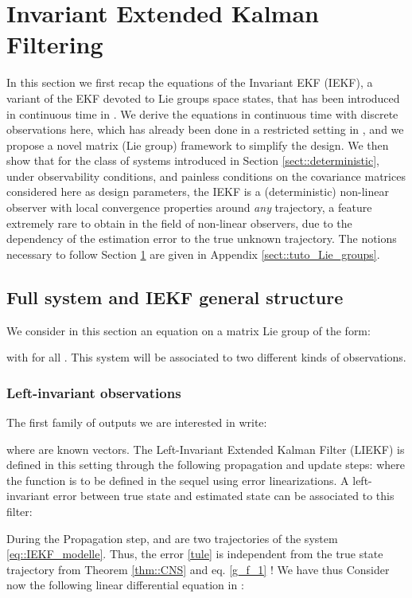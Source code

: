 \documentclass[a4paper,12pt,onecolumn]{article}
\begin{document}
\section{Invariant Extended Kalman Filtering}
\label{sect::IEKF}


In this section we first recap the equations of the Invariant EKF (IEKF), a variant of the EKF devoted to Lie groups space states, that has been introduced in continuous time in \cite{bonnabel2007left,bonnabel2009invariant}. We derive the equations in continuous time with discrete observations here, which has already been done in a restricted setting in \cite{barrau2013intrinsic}, and we propose a novel matrix (Lie group) framework to simplify the design. We then show that for the class of systems introduced in Section \ref{sect::deterministic}, under observability conditions, and painless conditions on the covariance matrices considered here as design parameters, the IEKF is a (deterministic) non-linear observer with local convergence properties around \emph{any} trajectory, a feature extremely rare to obtain in the field of non-linear observers, due to the dependency of the estimation error to the true unknown trajectory. The notions necessary to follow Section \ref{sect::IEKF} are given in Appendix \ref{sect::tuto_Lie_groups}. 

\subsection{Full system and IEKF general structure}


We consider in this section an equation on a matrix Lie group  of the form:

with  for all . This system will be associated to two different kinds of observations.

\subsubsection{Left-invariant observations}
The first family of outputs we are interested in write:

where  are known vectors.  The Left-Invariant Extended Kalman Filter (LIEKF) is defined in this setting through the following propagation  and update steps:
where the function  is to be defined in the sequel using error linearizations. 
A left-invariant error between true state  and estimated state  can be associated to this filter:

During the Propagation step,   and  are two trajectories of the system \eqref{eq::IEKF_modelle}. Thus, the error \eqref{tule} is independent from the true state trajectory from Theorem \ref{thm::CNS} and eq. \eqref{g_f_1} ! We have thus
Consider now the following linear differential equation in : 
\end{document}
